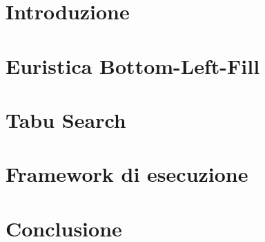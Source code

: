 \documentclass[a4paper,12pt,draft]{article}
\begin{document}


\begingroup
	\hypersetup{linkcolor=black}
	\setcounter{tocdepth}{2}
	\tableofcontents
\endgroup

\newpage

\section{Introduzione}


\section{Euristica Bottom-Left-Fill}


\section{Tabu Search}


\section{Framework di esecuzione}


\section{Conclusione}



{}


\end{document}
